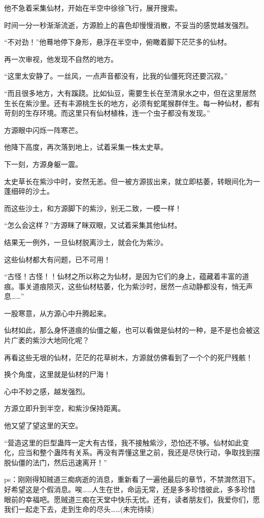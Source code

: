 \begin{this_body}
他不急着采集仙材，开始在半空中徐徐飞行，展开搜索。

时间一分一秒渐渐流逝，方源脸上的喜色却慢慢消散，不妥当的感觉越发强烈。

“不对劲！”他蓦地停下身形，悬浮在半空中，俯瞰着脚下茫茫多的仙材。

再一次审视，他发现不自然的地方。

“这里太安静了。一丝风，一点声音都没有，比我的仙僵死窍还要沉寂。”

“而且很多地方，大有蹊跷。比如仙豆，需要生长在至清泉水之中，但在这里居然生长在紫沙里。还有丰源桃生长的地方，必须有蛇尾猴群伴生。每一种仙材，都有苛刻的生存环境。而这里只有仙材植株，连一个虫子都没有发现。”

方源眼中闪烁一阵寒芒。

他降下高度，再次落到地上，试着采集一株太史草。

下一刻，方源身躯一震。

太史草长在紫沙中时，安然无恙。但一被方源拔出来，就立即枯萎，转眼间化为一蓬细碎的沙土。

而这些沙土，和方源脚下的紫沙，别无二致，一模一样！

“怎么会这样？”方源眯了眯双眼，又试着采集其他仙材。

结果无一例外，一旦仙材脱离沙土，就会化为紫沙。

这些仙材都大有问题，已不可用！

“古怪！古怪！！仙材之所以称之为仙材，是因为它们的身上，蕴藏着丰富的道痕。事关道痕陨灭，这些仙材枯萎，化为紫沙时，居然一点动静都没有，悄无声息……”

一股寒意，从方源心中升腾起来。

仙材如此，那么身怀道痕的仙僵之躯，也可以看做是仙材的一种，是不是也会被这片广袤的紫沙大地同化呢？

再看这些无垠的仙材，茫茫的花草树木，方源就仿佛看到了一个个的死尸残骸！

换个角度，这里就是仙材的尸海！

心中不妙之感，越发强烈。

方源立即升到半空，和紫沙保持距离。

他又望了望这里的天空。

“营造这里的巨型蛊阵一定大有古怪，我不接触紫沙，恐怕还不够。仙材如此变化，应当和整个蛊阵有关系。再没有弄懂这里之前，我还是尽快行动，争取找到摆脱仙僵的法门，然后迅速离开！”

ps：刚刚得知贼道三痴病逝的消息，重新看了一遍他最后的章节，不禁潸然泪下。好希望这是个假消息。唉……人生在世，命运无常，还是多多珍惜彼此，多多珍惜眼前的幸福吧。愿贼道三痴在天堂中快乐无忧。还有，读者朋友们，我爱你们，愿我们一起走下去，走到生命的尽头……(未完待续)

\end{this_body}

